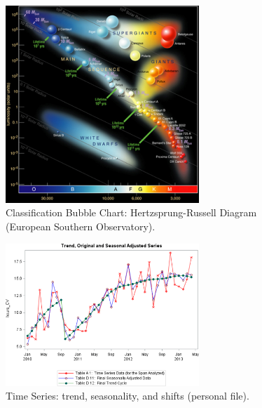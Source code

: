 \begin{figure}[t]
\centering
\includegraphics[width=0.65\textwidth]{Images/HR.png}
\caption[\small Classification Bubble Chart: Hertzsprung-Russell Diagram ]{\small Classification Bubble Chart: Hertzsprung-Russell Diagram (European Southern Observatory).} \label{fig:ex_bc_HR}
\end{figure}
\afterpage{\FloatBarrier}
\vfill
\begin{figure}[t]
\centering
\includegraphics[width=0.65\textwidth]{Images/TS.png}
\caption[\small Time Series: trend, seasonality, and shifts ]{\small Time Series: trend, seasonality, and shifts (personal file).} \label{fig:ex_ts_cv}
\end{figure}
\afterpage{\FloatBarrier}
\vfill
\newpage



